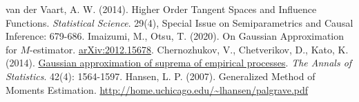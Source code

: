 \documentclass[uplatex,dvipdfmx]{jsreport}
\begin{document}
\begin{thebibliography}{99}
    van der Vaart, A. W. (2014). Higher Order Tangent Spaces and Influence Functions. \textit{Statistical Science}. 29(4), Special Issue on Semiparametrics and Causal Inference: 679-686.
    Imaizumi, M., Otsu, T. (2020). On Gaussian Approximation for $M$-estimator. \href{https://arxiv.org/abs/2012.15678}{arXiv:2012.15678}.
    Chernozhukov, V., Chetverikov, D., Kato, K. (2014). \href{https://arxiv.org/abs/1212.6885}{Gaussian approximation of suprema of empirical processes}. \textit{The Annals of Statistics}. 42(4): 1564-1597.
    Hansen, L. P. (2007). Generalized Method of Moments Estimation. \url{http://home.uchicago.edu/~lhansen/palgrave.pdf}
\end{thebibliography}
\end{document}
